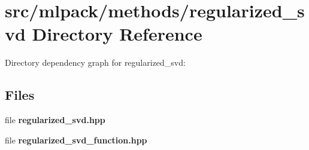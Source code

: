\section{src/mlpack/methods/regularized\-\_\-svd Directory Reference}
\label{dir_566ac1d2be43b5ecb9ea009b9f039c79}
Directory dependency graph for regularized\-\_\-svd\-:
\subsection*{Files}
\begin{DoxyCompactItemize}
\item 
file {\bf regularized\-\_\-svd.\-hpp}
\item 
file {\bf regularized\-\_\-svd\-\_\-function.\-hpp}
\end{DoxyCompactItemize}

